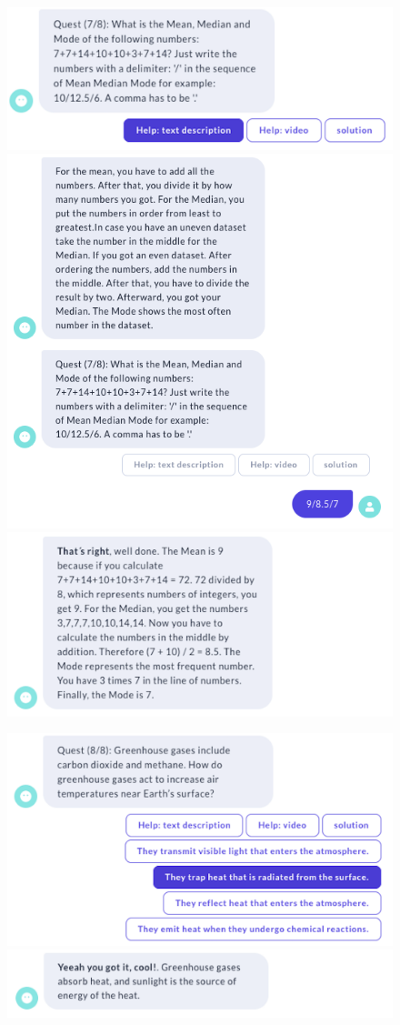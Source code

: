 \begin{figure}[H]
  \centering
  \includegraphics[width=0.7\linewidth]{images/VickyQuiz/Q11.2.png}
  \includegraphics[width=0.7\linewidth]{images/VickyQuiz/Q13.png}
  \includegraphics[width=0.7\linewidth]{images/VickyQuiz/Q12.1.png}
\end{figure} 
\begin{figure}[H]
  \centering

  \includegraphics[width=0.7\linewidth]{images/VickyQuiz/Q12.2.png}
  \includegraphics[width=0.7\linewidth]{images/VickyQuiz/Q13.5.png}
\label{fig:Anhang_Quiz-Spiel}
\end{figure} 

